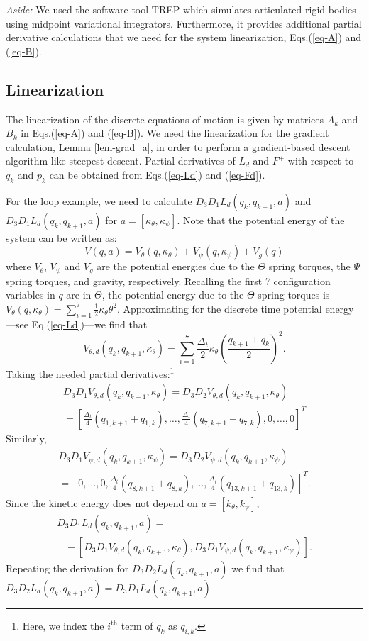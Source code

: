 \documentclass[letterpaper, 10pt, conference]{ieeeconf}
\begin{document}
\emph{Aside:}  We used the software tool TREP \cite{johnson_murphey_scalable} which simulates articulated rigid bodies using midpoint variational integrators.  Furthermore, it provides additional partial derivative calculations that we need for the system linearization, Eqs.(\ref{eq-A}) and (\ref{eq-B}).  

\subsection{Linearization}
The linearization of the discrete equations of motion is given by matrices $A_k$ and $B_k$ in Eqs.(\ref{eq-A}) and (\ref{eq-B}).  We need the linearization for the gradient calculation, Lemma \ref{lem-grad_a}, in order to perform a gradient-based descent algorithm like steepest descent.  Partial derivatives of $L_d$ and $F^+$ with respect to $q_k$ and $p_k$ can be obtained from Eqs.(\ref{eq-Ld}) and (\ref{eq-Fd}).

For the loop example, we need to calculate $D_3D_1L_d(q_k,q_{k+1},a)$ and $D_3D_1L_d(q_k,q_{k+1},a)$ for $a = [\kappa_\theta, \kappa_\psi]$.  Note that the potential energy of the system can be written as:
\[
V(q,a) = V_{\theta}(q,\kappa_{\theta}) + V_{\psi}(q,\kappa_{\psi}) + V_g(q)
\]
where $V_{\theta}$, $V_{\psi}$ and $V_g$ are the potential energies due to the $\Theta$ spring torques, the $\Psi$ spring torques, and gravity, respectively.  Recalling the first 7 configuration variables in $q$ are in $\Theta$, the potential energy due to the $\Theta$ spring torques is $V_{\theta}(q, \kappa_{\theta}) = \sum_{i = 1}^{7}\frac{1}{2}\kappa_{\theta}\theta^2$.  Approximating for the discrete time potential energy---see Eq.(\ref{eq-Ld})---we find that
\[
V_{\theta,d}(q_k,q_{k+1},\kappa_{\theta}) = \sum_{i=1}^7\frac{\Delta_t}{2}\kappa_{\theta}(\frac{q_{k+1} + q_k}{2})^2.
\]
Taking the needed partial derivatives:\footnote{Here, we index the $i^\textrm{th}$ term of $q_k$ as $q_{i,k}$.}
\[
\begin{array}{l}
D_3D_1 V_{\theta,d}(q_k,q_{k+1},\kappa_{\theta}) = D_3D_2 V_{\theta,d}(q_k,q_{k+1},\kappa_{\theta}) \\= [\frac{\Delta_t}{4}(q_{1,k+1} + q_{1,k}) , \ldots , \frac{\Delta_t}{4}(q_{7,k+1} + q_{7,k}), 0 ,\ldots, 0]^T
\end{array}
\]
Similarly, 
\[
\begin{array}{l}
D_3D_1 V_{\psi,d}(q_k,q_{k+1},\kappa_{\psi}) = D_3D_2 V_{\psi,d}(q_k,q_{k+1},\kappa_{\psi}) \\= [0,\ldots,0,\frac{\Delta_t}{4}(q_{8,k+1} + q_{8,k}) , \ldots , \frac{\Delta_t}{4}(q_{13,k+1} + q_{13,k})]^T.
\end{array}
\]
Since the kinetic energy does not depend on $a = [k_\theta, k_\psi]$,
\[
\begin{array}{l}
D_3D_1L_d(q_k,q_{k+1},a) = \\\hspace{10pt}- [D_3D_1 V_{\theta,d}(q_k,q_{k+1},\kappa_{\theta}), D_3D_1 V_{\psi,d}(q_k,q_{k+1},\kappa_{\psi})].
\end{array}
\]
Repeating the derivation for $D_3D_2L_d(q_k,q_{k+1},a)$ we find that $D_3D_2L_d(q_k,q_{k+1},a) = D_3D_1L_d(q_k,q_{k+1},a)$
\end{document}
